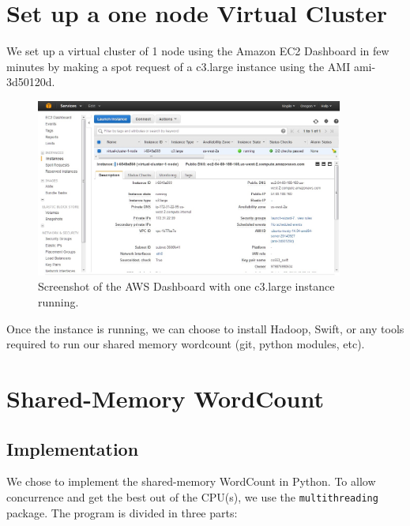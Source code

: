 \documentclass{article}
\begin{document}
\section{Set up a one node Virtual Cluster}

We set up a virtual cluster of 1 node using the Amazon EC2 Dashboard in few minutes by making a spot request of a c3.large instance using the AMI ami-3d50120d.

\begin{figure}[h!]
  \centering
  \includegraphics[width=0.9\textwidth]{img/virtual-cluster-one-node.jpg}
  \caption{Screenshot of the AWS Dashboard with one c3.large instance running.}
\end{figure}
Once the instance is running, we can choose to install Hadoop, Swift, or any tools required to run our shared memory wordcount (git, python modules, etc).


\section{Shared-Memory WordCount}

\subsection{Implementation}

We chose to implement the shared-memory WordCount in Python. To allow concurrence and get the best out of the CPU(s), we use the \lstinline|multithreading| package. The program is divided in three parts:
\end{document}
